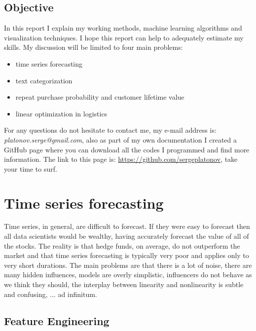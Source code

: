 \documentclass[11pt,fleqn]{book} %
\begin{document}
\clearpage
\section{Objective}

In this report I explain my working methods, machine learning algorithms and visualization techniques. I hope this report can help to adequately estimate my skills. My discussion will be limited to four main problems: 

\begin{itemize}
\item time series forecasting 
\item text categorization 
\item repeat purchase probability and customer lifetime value
\item linear optimization in logistics
\end{itemize}

\begin{remark}
 For any questions do not hesitate to contact me, my e-mail address is: \emph{platonov.serge@gmail.com}, also as part of my own documentation I created a GitHub page where you can download all the codes I programmed and find more information. The link to this page is: \url{https://github.com/sergeplatonov}, take your time to surf.
\end{remark}


\chapter{Time series forecasting}

Time series, in general, are difficult to forecast. If they were easy to forecast then all data scientists would be wealthy, having accurately forecast the value of all of the stocks. The reality is that hedge funds, on average, do not outperform the market and that time series forecasting is typically very poor and applies only to very short durations. The main problems are that there is a lot of noise, there are many hidden influences, models are overly simplistic, influencers do not behave as we think they should, the interplay between linearity and nonlinearity is subtle and confusing, ... ad infinitum.

\section{Feature Engineering}
\end{document}

